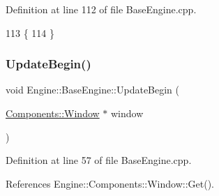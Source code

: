Definition at line 112 of file Base\+Engine.\+cpp.


\begin{DoxyCode}
113 \{
114 \}
\end{DoxyCode}
\mbox{\label{classEngine_1_1BaseEngine_aace6be2a42d12b64fbd35f1acdb08408}} 
\subsubsection{\texorpdfstring{Update\+Begin()}{UpdateBegin()}}
{\footnotesize\ttfamily void Engine\+::\+Base\+Engine\+::\+Update\+Begin (\begin{DoxyParamCaption}\item[{\mbox{\hyperlink{classEngine_1_1Components_1_1Window}{Components\+::\+Window}} $\ast$}]{window }\end{DoxyParamCaption})\hspace{0.3cm}{\ttfamily [virtual]}}



Definition at line 57 of file Base\+Engine.\+cpp.



References Engine\+::\+Components\+::\+Window\+::\+Get().


